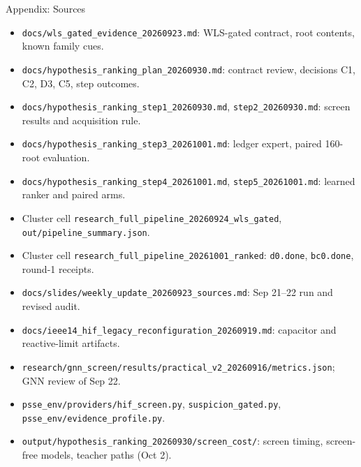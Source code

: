 \documentclass[aspectratio=169]{beamer}
\begin{document}
\begin{frame}{Appendix: Sources}
  \footnotesize
  \begin{itemize}
    \setlength\itemsep{0.25em}
    \item[S1] \texttt{docs/wls\_gated\_evidence\_20260923.md}: WLS-gated contract, root contents, known family cues.
    \item[S2] \texttt{docs/hypothesis\_ranking\_plan\_20260930.md}: contract review, decisions C1, C2, D3, C5, step outcomes.
    \item[S3] \texttt{docs/hypothesis\_ranking\_step1\_20260930.md}, \texttt{step2\_20260930.md}: screen results and acquisition rule.
    \item[S4] \texttt{docs/hypothesis\_ranking\_step3\_20261001.md}: ledger expert, paired 160-root evaluation.
    \item[S5] \texttt{docs/hypothesis\_ranking\_step4\_20261001.md}, \texttt{step5\_20261001.md}: learned ranker and paired arms.
    \item[S6] Cluster cell \texttt{research\_full\_pipeline\_20260924\_wls\_gated}, \texttt{out/pipeline\_summary.json}.
    \item[S7] Cluster cell \texttt{research\_full\_pipeline\_20261001\_ranked}: \texttt{d0.done}, \texttt{bc0.done}, round-1 receipts.
    \item[S8] \texttt{docs/slides/weekly\_update\_20260923\_sources.md}: Sep 21--22 run and revised audit.
    \item[S9] \texttt{docs/ieee14\_hif\_legacy\_reconfiguration\_20260919.md}: capacitor and reactive-limit artifacts.
    \item[S10] \texttt{research/gnn\_screen/results/practical\_v2\_20260916/metrics.json}; GNN review of Sep 22.
    \item[S11] \texttt{psse\_env/providers/hif\_screen.py}, \texttt{suspicion\_gated.py}, \texttt{psse\_env/evidence\_profile.py}.
    \item[S12] \texttt{output/hypothesis\_ranking\_20260930/screen\_cost/}: screen timing, screen-free models, teacher paths (Oct 2).
  \end{itemize}
\end{frame}
\end{document}
